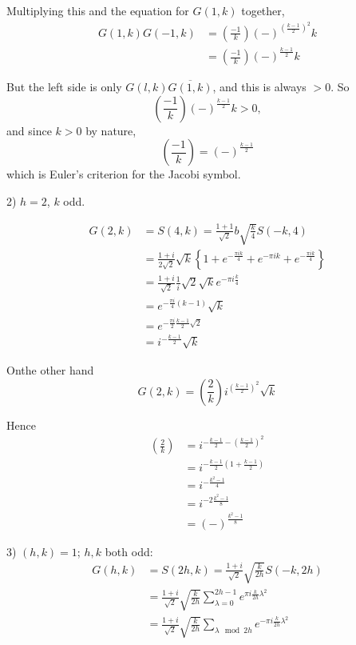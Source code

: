 Multiplying this and the equation for $G(1, k)$ together,
\begin{align*}
  G(1, k)G(-1, k) & = \left( \frac{-1}{k}\right) (-)^{\left(
    \frac{k-1}{2}\right)^2}k\\
  & = \left( \frac{-1}{k}\right) (-)^{\frac{k-1}{2}}k
\end{align*}

But the left side is only $G(l, k) \overline{G(1, k)}$, and this is
always $> 0$. So
$$
\left( \frac{-1}{k}\right) (-)^{\frac{k-1}{2}} k> 0,
$$
and since $k >0$ by nature,
$$
\left( \frac{-1}{k}\right) = (-)^{\frac{k-1}{2}}
$$
which is Euler's criterion for the Jacobi symbol.

2) $h=2$, $k$ odd.

\begin{align*}
  G(2, k) & = S(4, k) = \frac{1+1}{\sqrt{2}}b \sqrt{\frac{k}{4}} S(-k
  , 4) \\
  & = \frac{1+ i}{2 \sqrt{2}} \sqrt{k} \left\{ 1+ e^{- \frac{\pi i
      k}{4}} + e^{- \pi i k} + e^{- \frac{\pi i k}{4}}\right\}\\
  & = \frac{1+i}{\sqrt{2}} \frac{1}{i}{\sqrt{2}} \sqrt{k} e^{- \pi i \frac{k}{4}}\\
  & = e^{- \frac{\pi i}{4} (k-1)} \sqrt{k}\\
  & = e^{- \frac{\pi i}{2}\frac{k-1}{2} \sqrt{2}}\\
  & = i ^{- \frac{k-1}{2}} \sqrt{k}
\end{align*}

On\pageoriginale the other hand
$$
G(2, k)= \left( \frac{2}{k}\right) i^{\left( \frac{k-1}{2}\right)^2}
\sqrt{k} 
$$

Hence 
\begin{align*}
  \left( \frac{2}{k}\right) & = i^{- \frac{k-1}{2}- \left(
    \frac{k-1}{2}\right)^2}\\
  & = i^{- \frac{k-1}{2}\left( 1+ \frac{k-1}{2}\right) }\\
  & = i^{-\frac{k^2-1}{4}}\\
  & = i^{- 2 \frac{k^2-1}{8}}\\
  & = (-)^{\frac{k^2 -1}{8}}
\end{align*}

3) $(h, k)=1$; $h, k$ both odd:
\begin{align*}
  G(h, k) & = S(2h, k) = \frac{1+i}{\sqrt{2}} \sqrt{\frac{k}{2h}} S(-
    k, 2h)\\
    & = \frac{1+i}{\sqrt{2}} \sqrt{\frac{k}{2h}} \sum^{2h-1}_{\lambda
      =0} e^{\pi i \frac{k}{2h} \lambda^2}\\
    & = \frac{1+i}{\sqrt{2}} \sqrt{\frac{k}{2h}} \sum_{\lambda \mod
      2h} e^{- \pi i \frac{k}{2h} \lambda^2}
\end{align*}


